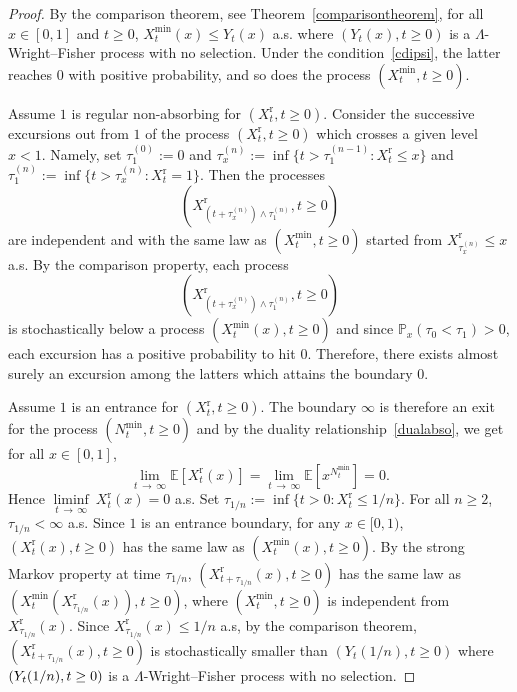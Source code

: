 \documentclass[10pt]{amsart}
\theoremstyle{definition}\newtheorem{defi}[theo]{Definition}\newtheorem{rema}[theo]{Remark}\newtheorem{exam}[theo]{Example}\newtheorem{exem}[theo]{Example}\newtheorem{nota}[theo]{Notation}
\newcommand{\rmr}{\mathrm{r}}
\newcommand{\bbE}{\mathbb{E}}
\newcommand{\bbP}{\mathbb{P}}
\begin{document}
\begin{proof}
By the comparison theorem, see Theorem~\ref{comparisontheorem}, for all $x\in [0,1]$ and $t\geq 0$, $X_t^{\min}(x)\leq Y_t(x)$ a.s. where $(Y_t(x),t\geq 0)$ is a $\Lambda$-Wright--Fisher process with no selection. Under the condition~\eqref{cdipsi}, the latter reaches $0$ with positive probability, and so does the process $(X_t^{\min},t\geq 0)$.

Assume $1$ is regular non-absorbing for $(X_t^{\rmr},t\geq 0)$. Consider the successive excursions out from $1$ of the process $(X_t^{\rmr},t\geq 0)$ which crosses a given level~$x<1$. Namely, set $\tau^{(0)}_1:=0$ and $ \tau^{(n)}_x:=\inf\{t>\tau^{(n-1)}_1: X_t^{\rmr}\leq x\}$ and $\tau^{(n)}_1:=\inf\{t>\tau^{(n)}_x: X_t^{\rmr}=1\}$. Then the processes
\[
\left(X^{\rmr}_{\left(t+\tau_x^{(n)}\right)\wedge \tau_1^{(n)}},t\geq 0\right)
\]
are independent and with the same law as $(X_t^{\min},t\geq 0)$ started from $X^{\rmr}_{\tau_x^{(n)}}\leq x$ a.s. By the comparison property, each process
\[
\left(X^{\rmr}_{\left(t+\tau_x^{(n)}\right)\wedge \tau_1^{(n)}},t\geq 0\right)
\]
is stochastically below a process $(X_t^{\min}(x),t\geq 0)$ and since $\bbP_x(\tau_0<\tau_1)>0$, each excursion has a positive probability to hit $0$. Therefore, there exists almost surely an excursion among the latters which attains the boundary $0$.

Assume $1$ is an entrance for $(X_t^{\rmr},t\geq 0)$. The boundary $\infty$ is therefore an exit for the process $(N^{\min}_t,t\geq 0)$ and by the duality relationship~\eqref{dualabso}, we get for all $x\in [0,1]$,
\[
\underset{t\,\rightarrow\,\infty}{\lim}\bbE\left[X_t^{\rmr}(x)\right]=\underset{t\,\rightarrow\,\infty}{\lim} \bbE\left[x^{N_t^{\min}}\right]=0.
\]
Hence $\underset{t\,\rightarrow\,\infty}{\liminf}\ X_t^{\rmr}(x)=0$ a.s. Set $\tau_{1/n}:=\inf\{t>0: X_t^{\rmr}\leq 1/n\}$. For all $n\geq 2$, $\tau_{1/n}<\infty$ a.s. Since $1$ is an entrance boundary, for any $x\in [0,1)$, $(X_t^{\rmr}(x),t\geq 0)$ has the same law as $(X_t^{\min}(x),t\geq 0)$. By the strong Markov property at time $\tau_{1/n}$, $(X_{t+\tau_{1/n}}^{\rmr}(x),t\geq 0)$ has the same law as $(X_t^{\min}(X^{\rmr}_{\tau_{1/n}}(x)),t\geq 0)$, where $(X_t^{\min},t\geq 0)$ is independent from $X^{\rmr}_{\tau_{1/n}}(x)$. Since $X^{\rmr}_{\tau_{1/n}}(x)\leq 1/n$ a.s, by the comparison theorem, $(X_{t+\tau_{1/n}}^{\rmr}(x),t\geq 0)$ is stochastically smaller than $(Y_t(1/n),t\geq 0)$ where $(Y_t(1/n),\linebreak t\geq 0)$ is a $\Lambda$-Wright--Fisher process with no selection.



\end{proof}
\end{document}
